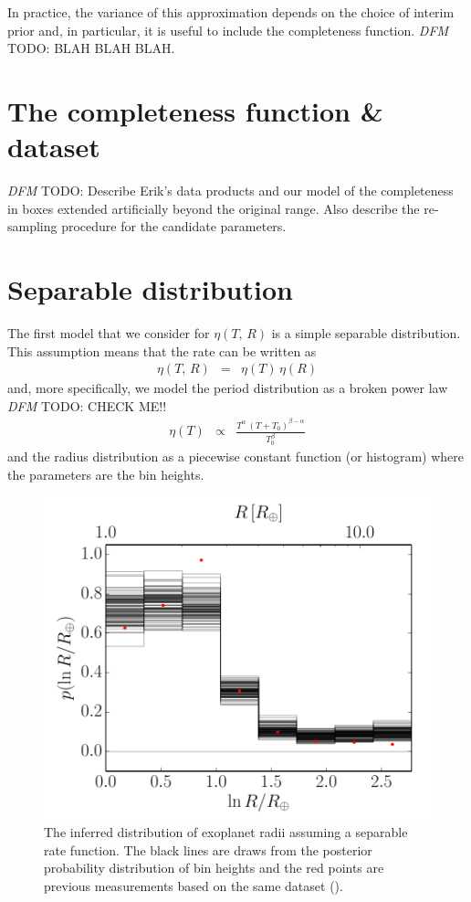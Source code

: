 \documentclass[12pt,preprint]{aastex}
\newcommand{\figlabel}[1]{\label{fig:#1}}
\newcommand{\todo}[3]{{\color{#2} \emph{#1} TODO: #3}}
\newcommand{\dfmtodo}[1]{\todo{DFM}{red}{#1}}
\newcommand{\rate}{\ensuremath{\eta}}
\newcommand{\radius}{\ensuremath{R}}
\newcommand{\period}{\ensuremath{T}}
\begin{document}
In practice, the variance of this approximation depends on the choice of
interim prior and, in particular, it is useful to include the completeness
function.
\dfmtodo{BLAH BLAH BLAH.}

\section{The completeness function \& dataset}

\dfmtodo{%
Describe Erik's data products and our model of the completeness in boxes
extended artificially beyond the original range.
Also describe the re-sampling procedure for the candidate parameters.
}

\section{Separable distribution}

The first model that we consider for $\rate(\period,\,\radius)$ is a simple
separable distribution.
This assumption means that the rate can be written as
\begin{eqnarray}
\rate(\period,\,\radius) &=& \rate(\period)\,\rate(\radius)
\end{eqnarray}
and, more specifically, we model the period distribution as a broken power law
\dfmtodo{CHECK ME!!}
\begin{eqnarray}
\rate(\period) &\propto& \frac{\period^\alpha \,
(\period+\period_0)^{\beta-\alpha}}{\period_0^\beta}
\end{eqnarray}
and the radius distribution as a piecewise constant function (or histogram)
where the parameters are the bin heights.

\begin{figure}
\begin{center}
\includegraphics{figures/separable-radius.pdf}
\end{center}
\caption{%
The inferred distribution of exoplanet radii assuming a separable rate
function.
The black lines are draws from the posterior probability distribution of bin
heights and the red points are previous measurements based on the same
dataset (\citealt{petigura}).
\figlabel{separable-radius}}
\end{figure}
\end{document}
